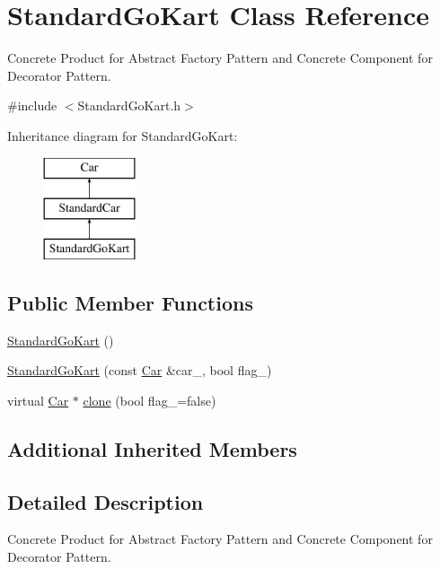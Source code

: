 \hypertarget{class_standard_go_kart}{}\section{Standard\+Go\+Kart Class Reference}
\label{class_standard_go_kart}


Concrete Product for Abstract Factory Pattern and Concrete Component for Decorator Pattern.  




{\ttfamily \#include $<$Standard\+Go\+Kart.\+h$>$}

Inheritance diagram for Standard\+Go\+Kart\+:\begin{figure}[H]
\begin{center}
\leavevmode
\includegraphics[height=3.000000cm]{class_standard_go_kart}
\end{center}
\end{figure}
\subsection*{Public Member Functions}
\begin{DoxyCompactItemize}
\item 
\mbox{\hyperlink{class_standard_go_kart_a9c4bbd015d1ae8b94a0b5f8ffd4e39b4}{Standard\+Go\+Kart}} ()
\item 
\mbox{\hyperlink{class_standard_go_kart_a92a4c08dfe2816ec215c05287a2c15c8}{Standard\+Go\+Kart}} (const \mbox{\hyperlink{class_car}{Car}} \&car\+\_\+, bool flag\+\_\+)
\item 
virtual \mbox{\hyperlink{class_car}{Car}} $\ast$ \mbox{\hyperlink{class_standard_go_kart_aec5a6e2e21ab80b0ee072bbcdcf0323a}{clone}} (bool flag\+\_\+=false)
\end{DoxyCompactItemize}
\subsection*{Additional Inherited Members}


\subsection{Detailed Description}
Concrete Product for Abstract Factory Pattern and Concrete Component for Decorator Pattern. 

